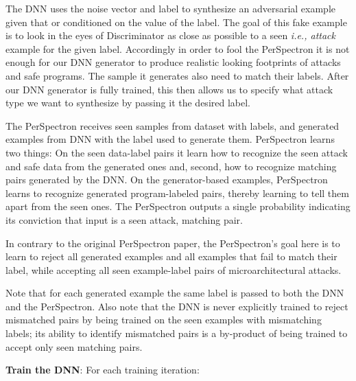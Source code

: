  The DNN uses the noise vector and label to synthesize an adversarial example given that or conditioned on the value of the label. The goal of this fake example is to look in the eyes of Discriminator as close as possible to a seen {\em i.e., attack} example for the given label.  
 Accordingly in order to fool the PerSpectron it is not enough for our DNN generator to produce realistic looking footprints of attacks and safe programs. The sample it generates also need to match their labels. After our DNN generator is fully trained, this then allows us to specify what attack type we want to synthesize by passing it the desired label. 
 
 The PerSpectron receives seen samples from dataset  with labels, and generated examples from DNN with the label used to generate them.  PerSpectron learns two things: 
 On the seen data-label pairs it learn
 how to recognize the seen attack and safe data from the generated ones and, second, how to recognize matching pairs generated by the DNN. On the generator-based examples, PerSpectron learns to recognize generated program-labeled pairs, thereby learning to tell them apart from the seen ones. The PerSpectron outputs a single probability indicating its conviction that input is a seen attack, matching pair. 
 
\begin{note}
{In contrary to the original PerSpectron paper, the PerSpectron's goal here is to learn to reject all generated examples and all examples that fail to match their label, while accepting all seen example-label pairs of microarchitectural attacks.}
 \end{note}
 
 Note that for each generated example the same label is passed to both the DNN and the PerSpectron. Also note that the DNN is never explicitly trained to reject mismatched pairs by being trained on the seen examples with mismatching labels; its ability to identify mismatched pairs is a by-product of being trained to accept only seen matching pairs. 
 
 
\noindent\textbf{Train the DNN}:
For each training iteration:

